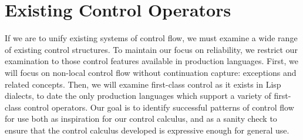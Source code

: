 \documentclass[11pt]{article}
\newcommand{\maybePage}{\null}
\begin{document}
%
%
%
%
%
%
%

\maybePage
\part{Existing Control Operators}

If we are to unify existing systems of control flow, we must examine a wide range of existing control structures. To maintain our focus on reliability, we restrict our examination to those control features available in production languages. First, we will focus on non-local control flow without continuation capture: exceptions and related concepts. Then, we will examine first-class control as it exists in Lisp dialects, to date the only production languages which support a variety of first-class control operators. Our goal is to identify successful patterns of control flow for use both as inspiration for our control calculus, and as a sanity check to ensure that the control calculus developed is expressive enough for general use.
\end{document}

